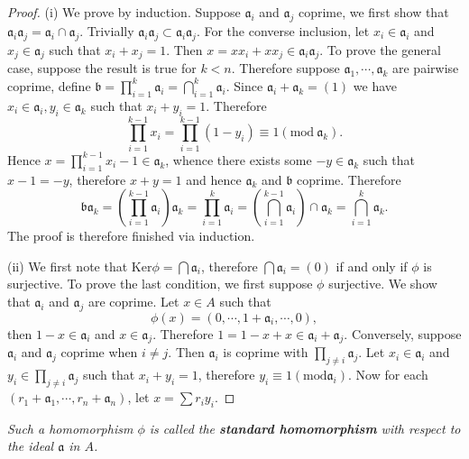 \begin{proof}
(i) We prove by induction. Suppose $\mathfrak{a}_i$ and $\mathfrak{a}_j$ coprime, we first show that $\mathfrak{a}_i\mathfrak{a}_j=\mathfrak{a}_i\cap\mathfrak{a}_j$. Trivially $\mathfrak{a}_i\mathfrak{a}_j\subset\mathfrak{a}_i\mathfrak{a}_j$. For the converse inclusion, let $x_i\in\mathfrak{a}_i$ and $x_j\in\mathfrak{a}_j$ such that $x_i+x_j=1$. Then $x=xx_i+xx_j\in\mathfrak{a}_i\mathfrak{a}_j$. To prove the general case, suppose the result is true for $k<n$. Therefore suppose $\mathfrak{a}_1,\cdots,\mathfrak{a}_k$ are pairwise coprime, define $\mathfrak{b}=\prod_{i=1}^k\mathfrak{a}_i=\bigcap_{i=1}^k\mathfrak{a}_i$. Since $\mathfrak{a}_i+\mathfrak{a}_k=(1)$ we have $x_i\in\mathfrak{a}_i,y_i\in\mathfrak{a}_k$ such that $x_i+y_i=1$. Therefore 
$$
\prod_{i=1}^{k-1}{x_i}=\prod_{i=1}^{k-1}{\left( 1-y_i \right)}\equiv 1\left( \mathrm{mod}\ \mathfrak{a} _k \right) .
$$
Hence $x=\prod_{i=1}^{k-1}x_i-1\in\mathfrak{a}_k$, whence there exists some $-y\in\mathfrak{a}_k$ such that $x-1=-y$, therefore $x+y=1$ and hence $\mathfrak{a}_k$ and $\mathfrak{b}$ coprime. Therefore 
$$
\mathfrak{b} \mathfrak{a} _k=\left( \prod_{i=1}^{k-1}{\mathfrak{a} _i} \right) \mathfrak{a} _k=\prod_{i=1}^k{\mathfrak{a} _i}=\left( \bigcap_{i=1}^{k-1}{\mathfrak{a} _i} \right) \cap \mathfrak{a} _k=\bigcap_{i=1}^k{\mathfrak{a} _k}.
$$
The proof is therefore finished via induction.\par
(ii) We first note that $\mathrm{Ker}\phi=\bigcap\mathfrak{a}_i$, therefore $\bigcap\mathfrak{a}_i=(0)$ if and only if $\phi$ is surjective. To prove the last condition, we first suppose $\phi$ surjective. We show that $\mathfrak{a}_i$ and $\mathfrak{a}_j$ are coprime. Let $x\in A$ such that 
$$
\phi \left( x \right) =\left( 0,\cdots ,1+\mathfrak{a} _i,\cdots ,0 \right) ,
$$
then $1-x\in\mathfrak{a}_i$ and $x\in\mathfrak{a}_j$. Therefore $1=1-x+x\in\mathfrak{a}_i+\mathfrak{a}_j$. Conversely, suppose $\mathfrak{a}_i$ and $\mathfrak{a}_j$ coprime when $i\ne j$. Then $\mathfrak{a}_i$ is coprime with $\prod_{j\ne i}\mathfrak{a}_j$. Let $x_i\in\mathfrak{a}_i$ and $y_i\in\prod_{j\ne i}\mathfrak{a}_j$ such that $x_i+y_i=1$, therefore $y_i\equiv 1(\mathrm{mod}\mathfrak{a}_i)$. Now for each $(r_1+\mathfrak{a}_1,\cdots,r_n+\mathfrak{a}_n)$, let $x=\sum r_iy_i$.
\end{proof}
\begin{note}\em
Such a homomorphism $\phi$ is called the \textbf{standard homomorphism} with respect to the ideal $\mathfrak{a}$ in $A$.
\end{note}
